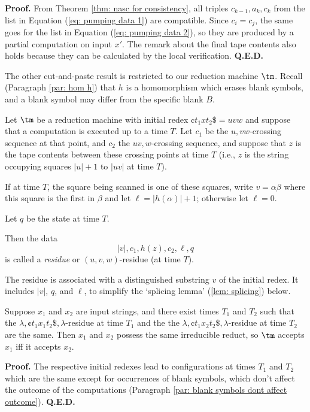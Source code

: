 {\bf Proof.}  From Theorem \ref{thm: nasc for consistency},
all triples $c_{k-1}, a_k, c_k$ from the list in Equation
(\ref{eq: pumping data 1}) are compatible.  Since
$c_i = c_j$, the same goes for the list in Equation
(\ref{eq: pumping data 2}), so they are produced by
a partial computation on input $x'$.  The remark about
the final tape contents also holds because they
can be calculated by the local verification. {\bf Q.E.D.}\medskip

The other cut-and-paste result is restricted to
our reduction machine $\tm$.
Recall
(Paragraph \ref{par: hom h})
that $h$ is a homomorphism which erases blank symbols,
and a blank symbol may differ from the specific
blank $B$.

\begin{definition}
\label{def: residue}
Let $\tm$ be a reduction machine
with initial redex  $\cent t_1 x t_2 \$ = uvw$ and suppose that
a computation is executed up to a time $T$.
Let $c_1$ be the $u,vw$-crossing sequence at that point,
and $c_2$ the $uv,w$-crossing sequence, and suppose
that $z$ is the tape contents between these crossing points
at time $T$ (i.e., $z$ is the string occupying
squares $|u|+1$ to $|uv|$ at time $T$).


If at time $T$, the square being scanned is one of these
squares, write $v=\alpha\beta$ where this square
is the first in $\beta$ and let $\ell = |h(\alpha)| + 1$;
otherwise let $\ell=0$.

Let $q$ be the state at time $T$.

Then the data
$$ |v|, c_1, h(z), c_2, \ell, q $$ is called a {\em residue} or
$(u,v,w)$-residue (at time $T$).
\end{definition}

The residue is associated with a distinguished substring $v$ of
the initial redex.  It includes $|v|$, $q$, and $\ell$,
to simplify the `splicing lemma'
(\ref{lem: splicing}) below.

\begin{lemma}
\label{lem: grand residue}
Suppose $x_1$ and $x_2$ are input strings,
and there exist times $T_1$ and $T_2$
such that the $\lambda, \cent t_1 x_1 t_2 \$,\lambda $-residue
at time $T_1$ and the
the $\lambda, \cent t_1 x_2 t_2 \$,\lambda $-residue
at time $T_2$ are the same.  Then $x_1$ and $x_2$
possess the same irreducible reduct, so $\tm$
accepts $x_1$ iff it accepts $x_2$.
\end{lemma}

{\bf Proof.} The respective initial redexes lead
to configurations
at times $T_1$ and $T_2$ which are the same except
for occurrences of blank symbols,  which don't
affect the outcome of the computations
(Paragraph \ref{par: blank symbols dont affect outcome}).
{\bf Q.E.D.}\medskip


